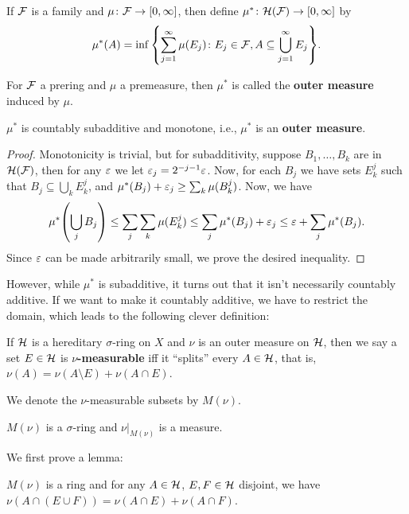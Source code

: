 \begin{definition}
    If $\mathcal F$ is a family and $\mu \colon \mathcal F \to [0, \infty]$, then define $\mu^* \colon \mathcal H(\mathcal F) \to [0, \infty]$ by 
    \[\mu^*(A) = \inf \qty{\sum_{j = 1}^\infty \mu(E_j) \colon E_j \in \mathcal F, A \subseteq \bigcup_{j = 1}^\infty E_j}.\]

    For $\mathcal F$ a prering and $\mu$ a premeasure, then $\mu^*$ is called the \textbf{outer measure} induced by $\mu$.
\end{definition}

\begin{proposition}
    $\mu^*$ is countably subadditive and monotone, i.e., $\mu^*$ is an \textbf{outer measure}.
\end{proposition}

\begin{proof}
    Monotonicity is trivial, but for subadditivity, suppose $B_1, \dots, B_k$ are in $\mathcal H(\mathcal F)$, then for any $\varepsilon$ we let $\varepsilon_j = 2^{-j - 1}\varepsilon$. Now, for each $B_j$ we have sets $E_k^j$ such that $B_j \subseteq \bigcup_k E^j_k$, and $\mu^*(B_j) + \varepsilon_j \ge \sum_k \mu(B_k^j)$. Now, we have \[\mu^*\qty(\bigcup_j B_j) \le \sum_j \sum_k \mu(E^j_k) \le \sum_j \mu^*(B_j) + \varepsilon_j \le \varepsilon + \sum_j \mu^*(B_j).\] Since $\varepsilon$ can be made arbitrarily small, we prove the desired inequality.
\end{proof}

However, while $\mu^*$ is subadditive, it turns out that it isn't necessarily countably additive. If we want to make it countably additive, we have to restrict the domain, which leads to the following clever definition:

\begin{definition}
    If $\mathcal H$ is a hereditary $\sigma$-ring on $X$ and $\nu$ is an outer measure on $\mathcal H$, then we say a set $E \in \mathcal H$ is \textbf{$\nu$-measurable} iff it ``splits'' every $A \in \mathcal H$, that is, $\nu(A) = \nu(A \setminus E) + \nu(A \cap E)$.

    We denote the $\nu$-measurable subsets by $M(\nu)$.
\end{definition}

\begin{proposition}[Caratheodory]
    $M(\nu)$ is a $\sigma$-ring and $\nu\vert_{M(\nu)}$ is a measure.
\end{proposition}

We first prove a lemma:

\begin{lemma}
    $M(\nu)$ is a ring and for any $A \in \mathcal H$, $E, F \in \mathcal H$ disjoint, we have $\nu(A \cap (E \cup F)) = \nu(A \cap E) + \nu(A \cap F)$.
\end{lemma}

